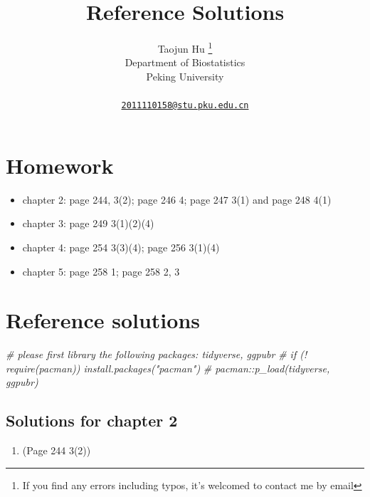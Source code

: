 \documentclass{article}
\title{Reference Solutions}
\author{
    Taojun Hu
    \thanks{If you find any errors including typos, it's welcomed to
contact me by email}
   \\
    Department of Biostatistics \\
    Peking University \\
   \\
  \texttt{\href{mailto:2011110158@stu.pku.edu.cn}{\nolinkurl{2011110158@stu.pku.edu.cn}}} \\
  }
\newenvironment{Shaded}{\begin{snugshade}}{\end{snugshade}}
\newcommand{\CommentTok}[1]{\textcolor[rgb]{0.56,0.35,0.01}{\textit{#1}}}
\begin{document}
\maketitle

\def\tightlist{}


\begin{abstract}

\end{abstract}


\hypertarget{homework}{%
\section{Homework}\label{homework}}

\begin{itemize}
\tightlist
\item
  chapter 2: page 244, 3(2); page 246 4; page 247 3(1) and page 248 4(1)
\item
  chapter 3: page 249 3(1)(2)(4)
\item
  chapter 4: page 254 3(3)(4); page 256 3(1)(4)
\item
  chapter 5: page 258 1; page 258 2, 3
\end{itemize}

\hypertarget{reference-solutions}{%
\section{Reference solutions}\label{reference-solutions}}

\begin{Shaded}
\begin{Highlighting}[]
\CommentTok{\# please first library the following packages: tidyverse, ggpubr}
\CommentTok{\# if (! require(pacman)) install.packages("pacman")}
\CommentTok{\# pacman::p\_load(tidyverse, ggpubr)}
\end{Highlighting}
\end{Shaded}

\hypertarget{solutions-for-chapter-2}{%
\subsection{Solutions for chapter 2}\label{solutions-for-chapter-2}}

\begin{enumerate}
\def\labelenumi{\arabic{enumi}.}
\tightlist
\item
  (Page 244 3(2))
\end{enumerate}
\end{document}
